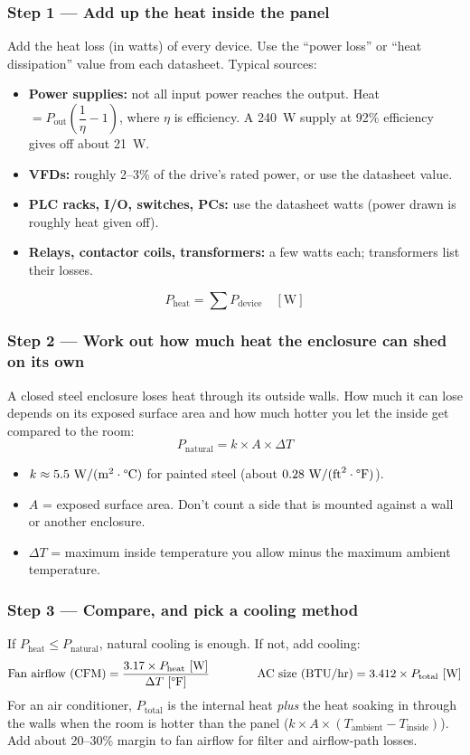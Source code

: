 \subsubsection*{Step 1 --- Add up the heat inside the panel}
Add the heat loss (in watts) of every device. Use the ``power loss'' or ``heat dissipation'' value from each datasheet. Typical sources:
\begin{itemize}[itemsep=1pt]
  \item \textbf{Power supplies:} not all input power reaches the output. Heat $= P_{\text{out}}\left(\dfrac{1}{\eta} - 1\right)$, where $\eta$ is efficiency. A 240~W supply at 92\% efficiency gives off about 21~W.
  \item \textbf{VFDs:} roughly 2--3\% of the drive's rated power, or use the datasheet value.
  \item \textbf{PLC racks, I/O, switches, PCs:} use the datasheet watts (power drawn is roughly heat given off).
  \item \textbf{Relays, contactor coils, transformers:} a few watts each; transformers list their losses.
\end{itemize}
\[
  P_{\text{heat}} = \sum P_{\text{device}} \quad [\text{W}]
\]

\subsubsection*{Step 2 --- Work out how much heat the enclosure can shed on its own}
A closed steel enclosure loses heat through its outside walls. How much it can lose depends on its exposed surface area and how much hotter you let the inside get compared to the room:
\[
  P_{\text{natural}} = k \times A \times \Delta T
\]
\begin{itemize}[itemsep=1pt]
  \item $k \approx 5.5~\text{W}/(\text{m}^2\cdot\text{\textdegree C})$ for painted steel (about $0.28~\text{W}/(\text{ft}^2\cdot\text{\textdegree F})$).
  \item $A$ = exposed surface area. Don't count a side that is mounted against a wall or another enclosure.
  \item $\Delta T$ = maximum inside temperature you allow minus the maximum ambient temperature.
\end{itemize}

\subsubsection*{Step 3 --- Compare, and pick a cooling method}
If $P_{\text{heat}} \leq P_{\text{natural}}$, natural cooling is enough. If not, add cooling:
\[
  \text{Fan airflow (CFM)} = \frac{3.17 \times P_{\text{heat}}~[\text{W}]}{\Delta T~[\text{\textdegree F}]}
  \qquad\qquad
  \text{AC size (BTU/hr)} = 3.412 \times P_{\text{total}}~[\text{W}]
\]
For an air conditioner, $P_{\text{total}}$ is the internal heat \emph{plus} the heat soaking in through the walls when the room is hotter than the panel ($k \times A \times (T_{\text{ambient}} - T_{\text{inside}})$). Add about 20--30\% margin to fan airflow for filter and airflow-path losses.

